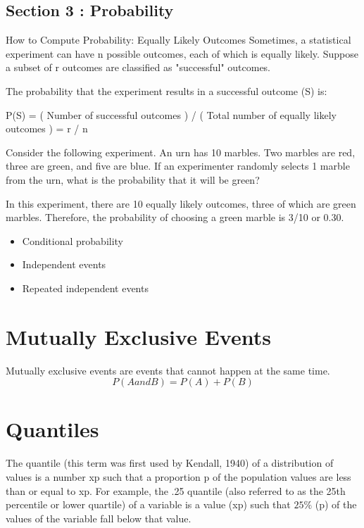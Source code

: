 \documentclass[12pt]{report}
\begin{document}
\subsection*{Section 3 : Probability}

How to Compute Probability: Equally Likely Outcomes
Sometimes, a statistical experiment can have n possible outcomes, each of which is equally likely. Suppose a subset of r outcomes are classified as "successful" outcomes.

The probability that the experiment results in a successful outcome (S) is:

P(S) = ( Number of successful outcomes ) / ( Total number of equally likely outcomes ) = r / n

Consider the following experiment. An urn has 10 marbles. Two marbles are red, three are green, and five are blue. If an experimenter randomly selects 1 marble from the urn, what is the probability that it will be green?

In this experiment, there are 10 equally likely outcomes, three of which are green marbles. Therefore, the probability of choosing a green marble is 3/10 or 0.30.

\begin{itemize}
	\item Conditional probability
	\item Independent events
	\item Repeated independent events
\end{itemize}


\section{Mutually Exclusive Events}
Mutually exclusive events are events that cannot happen at the same time.
\[ P(A and B) = P(A) + P(B) \]

\section{Quantiles}

The quantile (this term was first used by Kendall, 1940) of a distribution of values is a number xp such that a proportion p of the population values are less than or equal to xp. For example, the .25 quantile (also referred to as the 25th percentile or lower quartile) of a variable is a value (xp) such that $25\%$ (p) of the values of the variable fall below that value.
\end{document}
